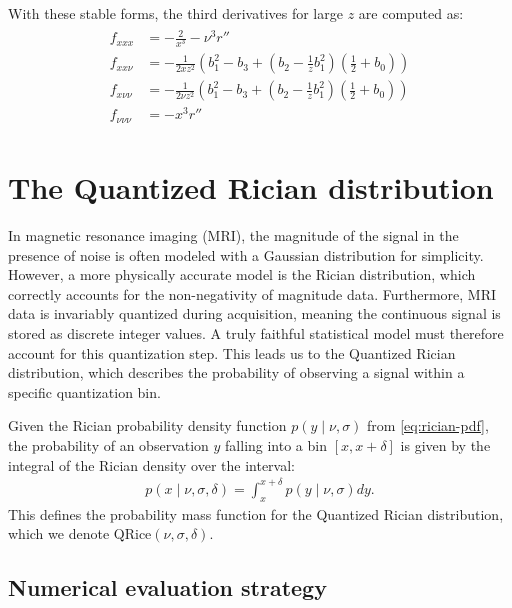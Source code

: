 \documentclass{article}
\begin{document}
With these stable forms, the third derivatives for large $z$ are computed as:
\begin{align}\label{eq:third-derivatives-large-z}
  \boxed{
    \begin{aligned}
      f_{xxx}       & = -\frac{2}{x^3} - \nu^3 r''                                                                      \\
      f_{xx\nu}     & = -\frac{1}{2 x z^2} \left( b_1^2 - b_3 + (b_2 - \frac{1}{z} b_1^2) (\frac{1}{2} + b_0) \right)   \\
      f_{x\nu\nu}   & = -\frac{1}{2 \nu z^2} \left( b_1^2 - b_3 + (b_2 - \frac{1}{z} b_1^2) (\frac{1}{2} + b_0) \right) \\
      f_{\nu\nu\nu} & = -x^3 r''
    \end{aligned}
  }
\end{align}

\section{The Quantized Rician distribution}

In magnetic resonance imaging (MRI), the magnitude of the signal in the presence of noise is often modeled with a Gaussian distribution for simplicity.
However, a more physically accurate model is the Rician distribution, which correctly accounts for the non-negativity of magnitude data.
Furthermore, MRI data is invariably quantized during acquisition, meaning the continuous signal is stored as discrete integer values.
A truly faithful statistical model must therefore account for this quantization step.
This leads us to the Quantized Rician distribution, which describes the probability of observing a signal within a specific quantization bin.

Given the Rician probability density function $p(y \mid \nu, \sigma)$ from \cref{eq:rician-pdf}, the probability of an observation $y$ falling into a bin $[x, x+\delta]$ is given by the integral of the Rician density over the interval:
%
\begin{align}\label{eq:quantized-rician-pdf}
  p(x \mid \nu, \sigma, \delta) = \int_x^{x+\delta} p(y \mid \nu, \sigma) dy.
\end{align}
%
This defines the probability mass function for the Quantized Rician distribution, which we denote $\mathrm{QRice}(\nu, \sigma, \delta)$.

\subsection{Numerical evaluation strategy}
\end{document}
